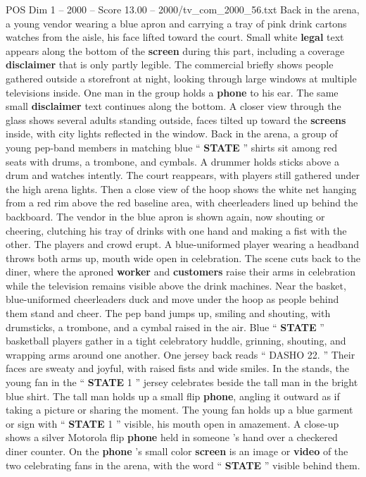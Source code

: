 \begin{textsample}{POS Dim 1 – 2000 – Score 13.00 – 2000/tv\_com\_2000\_56.txt}
Back in the arena, a young vendor wearing a blue apron and carrying a tray of pink drink cartons watches from the aisle, his face lifted toward the court.
Small white \textbf{legal} text appears along the bottom of the \textbf{screen} during this part, including a coverage \textbf{disclaimer} that is only partly legible.
The commercial briefly shows people gathered outside a storefront at night, looking through large windows at multiple televisions inside.
One man in the group holds a \textbf{phone} to his ear.
The same small \textbf{disclaimer} text continues along the bottom.
A closer view through the glass shows several adults standing outside, faces tilted up toward the \textbf{screens} inside, with city lights reflected in the window.
Back in the arena, a group of young pep-band members in matching blue “ \textbf{STATE} ” shirts sit among red seats with drums, a trombone, and cymbals.
A drummer holds sticks above a drum and watches intently.
The court reappears, with players still gathered under the high arena lights.
Then a close view of the hoop shows the white net hanging from a red rim above the red baseline area, with cheerleaders lined up behind the backboard.
The vendor in the blue apron is shown again, now shouting or cheering, clutching his tray of drinks with one hand and making a fist with the other.
The players and crowd erupt.
A blue-uniformed player wearing a headband throws both arms up, mouth wide open in celebration.
The scene cuts back to the diner, where the aproned \textbf{worker} and \textbf{customers} raise their arms in celebration while the television remains visible above the drink machines.
Near the basket, blue-uniformed cheerleaders duck and move under the hoop as people behind them stand and cheer.
The pep band jumps up, smiling and shouting, with drumsticks, a trombone, and a cymbal raised in the air.
Blue “ \textbf{STATE} ” basketball players gather in a tight celebratory huddle, grinning, shouting, and wrapping arms around one another.
One jersey back reads “ DASHO 22. ” Their faces are sweaty and joyful, with raised fists and wide smiles.
In the stands, the young fan in the “ \textbf{STATE} 1 ” jersey celebrates beside the tall man in the bright blue shirt.
The tall man holds up a small flip \textbf{phone}, angling it outward as if taking a picture or sharing the moment.
The young fan holds up a blue garment or sign with “ \textbf{STATE} 1 ” visible, his mouth open in amazement.
A close-up shows a silver Motorola flip \textbf{phone} held in someone ’s hand over a checkered diner counter.
On the \textbf{phone} ’s small color \textbf{screen} is an image or \textbf{video} of the two celebrating fans in the arena, with the word “ \textbf{STATE} ” visible behind them.

\end{textsample}
